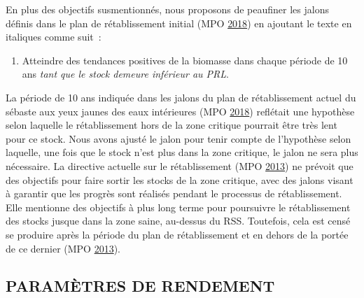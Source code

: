 \documentclass[french,11pt]{book}
\begin{document}
En plus des objectifs susmentionnés, nous proposons de peaufiner les jalons définis dans le plan de rétablissement initial (MPO \protect\hyperlink{ref-ifmp2018}{2018}) en ajoutant le texte en italiques comme suit~:
\begin{enumerate}
\def\labelenumi{\arabic{enumi}.}
\setcounter{enumi}{5}

\item
  Atteindre des tendances positives de la biomasse dans chaque période de 10 ans \emph{tant que le stock demeure inférieur au PRL}.
\end{enumerate}
La période de 10 ans indiquée dans les jalons du plan de rétablissement actuel du sébaste aux yeux jaunes des eaux intérieures (MPO \protect\hyperlink{ref-ifmp2018}{2018}) reflétait une hypothèse selon laquelle le rétablissement hors de la zone critique pourrait être très lent pour ce stock. Nous avons ajusté le jalon pour tenir compte de l'hypothèse selon laquelle, une fois que le stock n'est plus dans la zone critique, le jalon ne sera plus nécessaire. La directive actuelle sur le rétablissement (MPO \protect\hyperlink{ref-dfo2013}{2013}) ne prévoit que des objectifs pour faire sortir les stocks de la zone critique, avec des jalons visant à garantir que les progrès sont réalisés pendant le processus de rétablissement. Elle mentionne des objectifs à plus long terme pour poursuivre le rétablissement des stocks jusque dans la zone saine, au-dessus du RSS. Toutefois, cela est censé se produire après la période du plan de rétablissement et en dehors de la portée de ce dernier (MPO \protect\hyperlink{ref-dfo2013}{2013}).

\hypertarget{sec:objectives-metrics-pm}{%
\subsection{PARAMÈTRES DE RENDEMENT}\label{sec:objectives-metrics-pm}}
\end{document}
